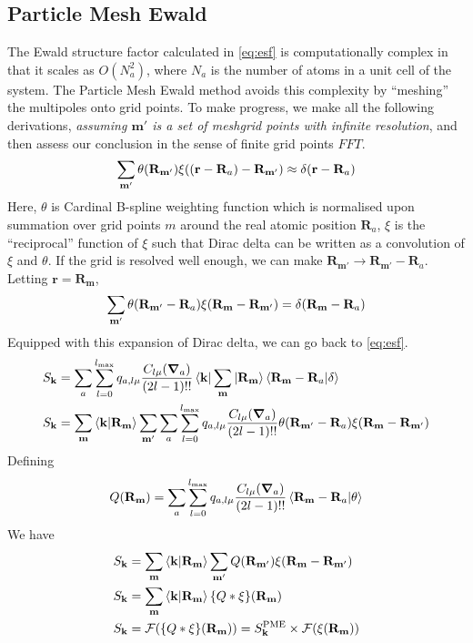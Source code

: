 \documentclass[12pt]{extarticle}
\renewcommand{\bf}{\mathbf}
\begin{document}
    \subsection{Particle Mesh Ewald}
    The Ewald structure factor calculated in \cref{eq:esf} is computationally complex in that it scales as \(O(N_a^2)\), where \(N_a\) is the number of atoms in a unit cell of the system. The Particle Mesh Ewald method avoids this complexity by ``meshing'' the multipoles onto grid points. To make progress, we make all the following derivations, \emph{assuming \(\bf m'\) is a set of meshgrid points with infinite resolution}, and then assess our conclusion in the sense of finite grid points \(FFT\).
    \begin{align*}
        \sum_{\bf m'} \theta(\bf R_{\bf m'}) \xi\pqty{\pqty{\bf r - \bf R_a} - \bf R_{\bf m'}} \approx \delta(\bf r -\bf R_a)
    \end{align*}
    Here, \(\theta\) is Cardinal B-spline weighting function which is normalised upon summation over grid points \(m\) around the real atomic position \(\bf R_a\), \(\xi\) is the ``reciprocal'' function of \(\xi\) such that Dirac delta can be written as a convolution of \(\xi\) and \(\theta\). If the grid is resolved well enough, we can make \(\bf R_{\bf m'} \to \bf R_{\bf m'} - \bf R_a\). Letting \(\bf r = \bf R_{\bf m}\), 
    \begin{align*}
        \sum_{\bf m'} \theta(\bf R_{\bf m'} - \bf R_a) \xi\pqty{\bf R_{\bf m} - \bf R_{\bf m'}} = \delta(\bf R_{\bf m} - \bf R_a)
    \end{align*}
    Equipped with this expansion of Dirac delta, we can go back to \cref{eq:esf}. 
    \begin{align*}
        S_{\bf k} &= \sum_{a} \sum_{l = 0}^{l_{\max}} q_{a, l \mu} \frac{C_{l \mu} (\grad_a)}{(2l - 1)!!} \bra{\bf k} \sum_{\bf m} \ket{\bf R_{\bf m}} \bra{\bf R_{\bf m} - \bf R_a} \ket{ \delta}\\ 
        S_{\bf k} &= \sum_{\bf m} \bra{\bf k}  \ket{\bf R_{\bf m}}  \sum_{\bf m'} \sum_{a} \sum_{l = 0}^{l_{\max}} q_{a, l \mu} \frac{C_{l \mu} (\grad_a)}{(2l - 1)!!}  \theta(\bf R_{\bf m'} - \bf R_a) \xi\pqty{\bf R_{\bf m} - \bf R_{\bf m'}}
    \end{align*}
    Defining \[
        Q(\bf R_{\bf m}) = \sum_{a} \sum_{l = 0}^{l_{\max}} q_{a, l \mu} \frac{C_{l \mu} (\grad_a)}{(2l - 1)!!} \bra{\bf R_{\bf m} - \bf R_a} \ket{\theta}
    \]
    We have \begin{align*}
        S_{\bf k} &= \sum_{\bf m} \bra{\bf k}  \ket{\bf R_{\bf m}}  \sum_{\bf m'}  Q(\bf R_{\bf m'})\xi\pqty{\bf R_{\bf m} - \bf R_{\bf m'}}\\
        S_{\bf k} &= \sum_{\bf m} \bra{\bf k}  \ket{\bf R_{\bf m}} \qty{Q * \xi}\pqty{\bf R_{\bf m}}\\
        S_{\bf k} &= \mathcal{F} \pqty{\qty{Q * \xi}\pqty{\bf R_{\bf m}}} =S^\text{PME}_{\bf k} \times \mathcal{F} \pqty{\xi\pqty{\bf R_{\bf m}}}
    \end{align*}
\end{document}

